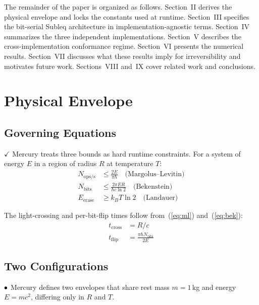 \documentclass[conference,letterpaper,10pt]{IEEEtran}
\newcommand{\Verified}{\textbf{\textcolor[rgb]{0.0,0.5,0.0}{$\checkmark$}}}
\newcommand{\Plausible}{\textbf{\textcolor[rgb]{0.6,0.4,0.0}{$\bullet\hspace{-0.5em}\circ$}}}
\begin{document}
The remainder of the paper is organized as follows. Section~II
derives the physical envelope and locks the constants used at
runtime. Section~III specifies the bit-serial Subleq architecture
in implementation-agnostic terms. Section~IV summarizes the three
independent implementations. Section~V describes the cross-implementation
conformance regime. Section~VI presents the numerical results.
Section~VII discusses what these results imply for irreversibility
and motivates future work. Sections~VIII and~IX cover related work
and conclusions.

\section{Physical Envelope}

\subsection{Governing Equations}

\Verified{} Mercury treats three bounds as hard runtime
constraints. For a system of energy $E$ in a region of radius
$R$ at temperature $T$:
\begin{align}
    N_{\mathrm{ops/s}} &\le \frac{2E}{\pi \hbar} \quad \text{(Margolus--Levitin)} \label{eq:ml}\\
    N_{\mathrm{bits}}  &\le \frac{2\pi E R}{\hbar c \ln 2} \quad \text{(Bekenstein)} \label{eq:bek}\\
    E_{\mathrm{erase}} &\ge k_B T \ln 2 \quad \text{(Landauer)} \label{eq:lan}
\end{align}

The light-crossing and per-bit-flip times follow from~(\ref{eq:ml})
and~(\ref{eq:bek}):
\begin{align}
    t_{\mathrm{cross}} &= R/c \\
    t_{\mathrm{flip}}  &= \frac{\pi \hbar N_{\mathrm{bits}}}{2E}
\end{align}

\subsection{Two Configurations}

\Plausible{} Mercury defines two envelopes that share rest mass
$m=1$\,kg and energy $E = mc^2$, differing only in $R$ and $T$.
\end{document}
